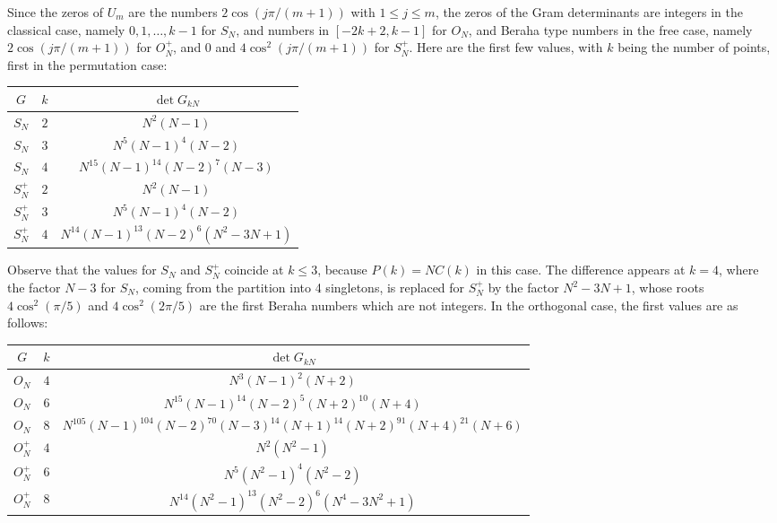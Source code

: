 \documentclass[11pt]{amsart}
\theoremstyle{definition}
\begin{document}
Since the zeros of $U_m$ are the numbers $2\cos(j\pi/(m+1))$ with $1\leq j\leq m$, the zeros of the Gram determinants are integers in the classical case, namely $0,1,\ldots,k-1$ for $S_N$, and numbers in $[-2k+2,k-1]$ for $O_N$, and Beraha type numbers in the free case, namely $2\cos(j\pi/(m+1))$ for $O_N^+$, and $0$ and $4\cos^2(j\pi/(m+1))$ for $S_N^+$. Here are the first few values, with $k$ being the number of points, first in the permutation case:
\begin{center}
\renewcommand{\arraystretch}{1.4}
\begin{tabular}{|c|c|c|}
\hline
$G$&$k$&$\det G_{kN}$\\
\hline
$S_N$&$2$&$N^2(N-1)$\\
\hline
$S_N$&$3$&$N^5(N-1)^4(N-2)$\\
\hline
$S_N$&$4$&$N^{15}(N-1)^{14}(N-2)^7(N-3)$\\
\hline
$S_N^+$&$2$&$N^2(N-1)$\\
\hline
$S_N^+$&$3$&$N^5(N-1)^4(N-2)$\\
\hline
$S_N^+$&$4$&$N^{14}(N-1)^{13}(N-2)^6(N^2-3N+1)$\\
\hline
\end{tabular}
\end{center}

Observe that the values for $S_N$ and $S_N^+$ coincide at $k\leq3$, because $P(k)=NC(k)$ in this case. The difference appears at $k=4$, where the factor $N-3$ for $S_N$, coming from the partition into 4 singletons, is replaced for $S_N^+$ by the factor $N^2-3N+1$, whose roots $4\cos^2(\pi/5)$ and $4\cos^2(2\pi/5)$ are the first Beraha numbers which are not integers. In the orthogonal case, the first values are as follows:
\begin{center}
\renewcommand{\arraystretch}{1.4}
\begin{tabular}{|c|c|c|}
\hline
$G$&$k$&$\det G_{kN}$\\
\hline
$O_N$&$4$&$N^3(N-1)^2(N+2)$\\
\hline
$O_N$&$6$&$N^{15}(N-1)^{14}(N-2)^5(N+2)^{10}(N+4)$\\
\hline
$O_N$&$8$&$N^{105}(N-1)^{104}(N-2)^{70}(N-3)^{14}(N+1)^{14}(N+2)^{91}(N+4)^{21}(N+6)$\\
\hline
$O_N^+$&$4$&$N^2(N^2-1)$\\
\hline
$O_N^+$&$6$&$N^5(N^2-1)^4(N^2-2)$\\
\hline
$O_N^+$&$8$&$N^{14}(N^2-1)^{13}(N^2-2)^6(N^4-3N^2+1)$\\
\hline
\end{tabular}
\end{center}
\end{document}
